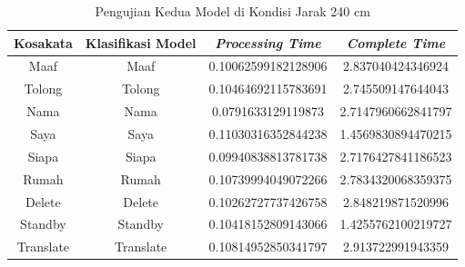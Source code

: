 \begin{longtable}{|c|c|c|c|}
  \caption{Pengujian Kedua Model di Kondisi Jarak 240 cm}
  \label{tb:prediksitengah2}                                   \\
  \hline
  \rowcolor[HTML]{C0C0C0}
  \textbf{Kosakata} & \textbf{Klasifikasi Model} & \textbf{\emph{Processing Time}} & \textbf{\emph{Complete Time}}\\
  \hline
  Maaf              & Maaf                        & 0.10062599182128906                           & 2.837040424346924                                  \\
  Tolong            & Tolong                        & 0.10464692115783691                           & 2.745509147644043                                  \\
  Nama              & Nama                        & 0.0791633129119873                          & 2.7147960662841797                                  \\
  Saya              & Saya                        & 0.11030316352844238                           & 1.4569830894470215                                  \\
  Siapa              & Siapa                        & 0.09940838813781738                           & 2.7176427841186523                                  \\
  Rumah             & Rumah                        & 0.10739994049072266                           & 2.7834320068359375                                  \\
  Delete            & Delete                        & 0.10262727737426758                           & 2.848219871520996                                  \\
  Standby           & Standby                        & 0.10418152809143066                           & 1.4255762100219727                                  \\
  Translate         & Translate                        & 0.10814952850341797                           & 2.913722991943359                                  \\
  \hline
\end{longtable}

